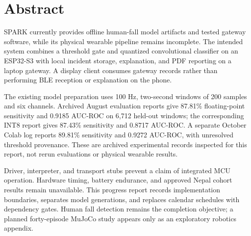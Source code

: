 \chapter*{Abstract}
SPARK currently provides offline human-fall model artifacts and tested gateway software, while its physical wearable pipeline remains incomplete. The intended system combines a threshold gate and quantized convolutional classifier on an ESP32-S3 with local incident storage, explanation, and PDF reporting on a laptop gateway. A display client consumes gateway records rather than performing BLE reception or explanation on the phone.

The existing model preparation uses 100 Hz, two-second windows of 200 samples and six channels. Archived August evaluation reports give 87.81\% floating-point sensitivity and 0.9185 AUC-ROC on 6,712 held-out windows; the corresponding INT8 report gives 87.43\% sensitivity and 0.8717 AUC-ROC. A separate October Colab log reports 89.81\% sensitivity and 0.9272 AUC-ROC, with unresolved threshold provenance. These are archived experimental records inspected for this report, not rerun evaluations or physical wearable results.

Driver, interpreter, and transport stubs prevent a claim of integrated MCU operation. Hardware timing, battery endurance, and approved Nepal cohort results remain unavailable. This progress report records implementation boundaries, separates model generations, and replaces calendar schedules with dependency gates. Human fall detection remains the completion objective; a planned forty-episode MuJoCo study appears only as an exploratory robotics appendix.
